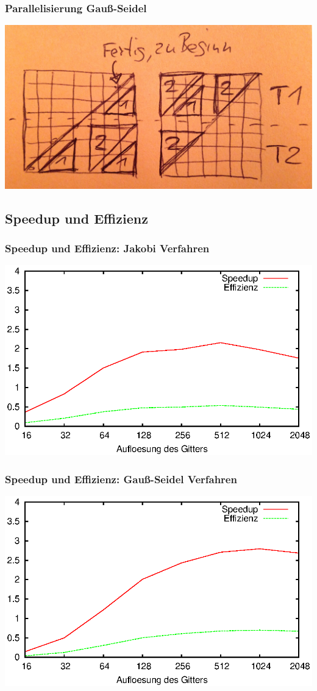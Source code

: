 \documentclass{beamer}
\begin{document}
\begin{frame}
    \frametitle{Parallelisierung Gauß-Seidel}
    \includegraphics[width=\textwidth]{gaussseideldreiecke}
\end{frame}

\subsection{Speedup und Effizienz}
\begin{frame}
    \frametitle{Speedup und Effizienz: Jakobi Verfahren}
    \includegraphics[width=\textwidth]{benchmarkjakobi}
\end{frame}

\begin{frame}
    \frametitle{Speedup und Effizienz: Gauß-Seidel Verfahren}
    \includegraphics[width=\textwidth]{benchmarkgaussseidel}
\end{frame}
\end{document}
